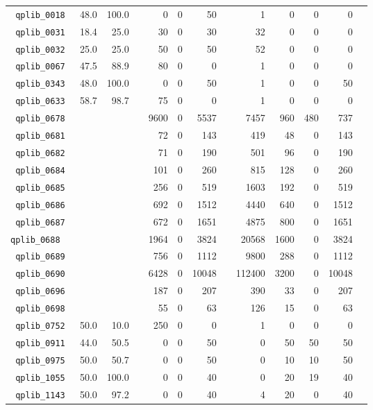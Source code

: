 {\begin{longtable}{lrrrrrrrrrrrr}
\texttt{ 	qplib\_0018	}	&	48.0	&	100.0	&	&	0	&	0	&	50	&	&	1	&	0	&	0	&	0	\\
\texttt{ 	qplib\_0031	}	&	18.4	&	25.0	&	&	30	&	0	&	30	&	&	32	&	0	&	0	&	0	\\
\texttt{ 	qplib\_0032	}	&	25.0	&	25.0	&	&	50	&	0	&	50	&	&	52	&	0	&	0	&	0	\\
\texttt{ 	qplib\_0067	}	&	47.5	&	88.9	&	&	80	&	0	&	0	&	&	1	&	0	&	0	&	0	\\
\texttt{ 	qplib\_0343	}	&	48.0	&	100.0	&	&	0	&	0	&	50	&	&	1	&	0	&	0	&	50	\\
\texttt{ 	qplib\_0633	}	&	58.7	&	98.7	&	&	75	&	0	&	0	&	&	1	&	0	&	0	&	0	\\
\texttt{ 	qplib\_0678	}	&		&		&	&	9600	&	0	&	5537	&	&	7457	&	960	&	480	&	737	\\
\texttt{ 	qplib\_0681	}	&		&		&	&	72	&	0	&	143	&	&	419	&	48	&	0	&	143	\\
\texttt{ 	qplib\_0682	}	&		&		&	&	71	&	0	&	190	&	&	501	&	96	&	0	&	190	\\
\texttt{ 	qplib\_0684	}	&		&		&	&	101	&	0	&	260	&	&	815	&	128	&	0	&	260	\\
\texttt{ 	qplib\_0685	}	&		&		&	&	256	&	0	&	519	&	&	1603	&	192	&	0	&	519	\\
\texttt{ 	qplib\_0686	}	&		&		&	&	692	&	0	&	1512	&	&	4440	&	640	&	0	&	1512	\\
\texttt{ 	qplib\_0687	}	&		&		&	&	672	&	0	&	1651	&	&	4875	&	800	&	0	&	1651	\\
{\tt 	qplib\_0688	}	&		&		&	&	1964	&	0	&	3824	&	&	20568	&	1600	&	0	&	3824	\\
\texttt{ 	qplib\_0689	}	&		&		&	&	756	&	0	&	1112	&	&	9800	&	288	&	0	&	1112	\\
\texttt{ 	qplib\_0690	}	&		&		&	&	6428	&	0	&	10048	&	&	112400	&	3200	&	0	&	10048	\\
\texttt{ 	qplib\_0696	}	&		&		&	&	187	&	0	&	207	&	&	390	&	33	&	0	&	207	\\
\texttt{ 	qplib\_0698	}	&		&		&	&	55	&	0	&	63	&	&	126	&	15	&	0	&	63	\\
\texttt{ 	qplib\_0752	}	&	50.0	&	10.0	&	&	250	&	0	&	0	&	&	1	&	0	&	0	&	0	\\
\texttt{ 	qplib\_0911	}	&	44.0	&	50.5	&	&	0	&	0	&	50	&	&	0	&	50	&	50	&	50	\\
\texttt{ 	qplib\_0975	}	&	50.0	&	50.7	&	&	0	&	0	&	50	&	&	0	&	10	&	10	&	50	\\
\texttt{ 	qplib\_1055	}	&	50.0	&	100.0	&	&	0	&	0	&	40	&	&	0	&	20	&	19	&	40	\\
\texttt{ 	qplib\_1143	}	&	50.0	&	97.2	&	&	0	&	0	&	40	&	&	4	&	20	&	0	&	40	\\

\end{longtable}}
